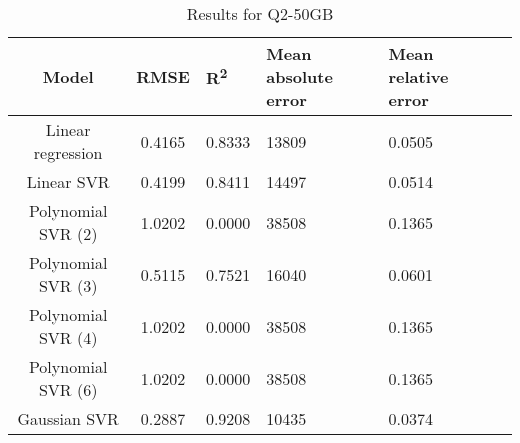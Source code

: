 \begin{table}[H]
\centering
\begin{adjustbox}{center}
\begin{tabular}{c | c M{1.2cm} M{2.5cm} M{2.5cm} M{1.8cm}}
Model & RMSE & R\textsuperscript{2} & Mean absolute error & Mean relative error \tabularnewline
\hline
Linear regression & 0.4165 & 0.8333 &  13809 & 0.0505 \\
Linear SVR & 0.4199 & 0.8411 &  14497 & 0.0514 \\
Polynomial SVR (2) & 1.0202 & 0.0000 &  38508 & 0.1365 \\
Polynomial SVR (3) & 0.5115 & 0.7521 &  16040 & 0.0601 \\
Polynomial SVR (4) & 1.0202 & 0.0000 &  38508 & 0.1365 \\
Polynomial SVR (6) & 1.0202 & 0.0000 &  38508 & 0.1365 \\
Gaussian SVR & 0.2887 & 0.9208 &  10435 & 0.0374 \\
\end{tabular}
\end{adjustbox}
\\
\caption{Results for Q2-50GB}
\label{tab:all_linear_Q2_50}
\end{table}
